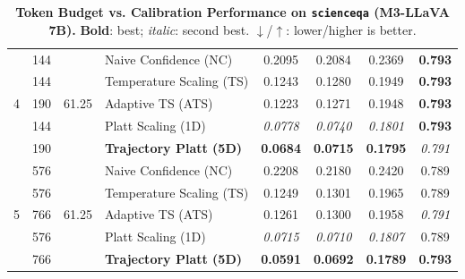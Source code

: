 \begin{table}[t]
\begin{tabular}{ccclcccc}
\midrule
\multirow{5}{*}{4} & 144 & \multirow{5}{*}{61.25} & Naive Confidence (NC) & 0.2095 & 0.2084 & 0.2369 & \textbf{0.793} \\
 & 144 &  & Temperature Scaling (TS) & 0.1243 & 0.1280 & 0.1949 & \textbf{0.793} \\
 & 190 &  & Adaptive TS (ATS) & 0.1223 & 0.1271 & 0.1948 & \textbf{0.793} \\
 & 144 &  & Platt Scaling (1D) & \textit{0.0778} & \textit{0.0740} & \textit{0.1801} & \textbf{0.793} \\
 & 190 &  & \textbf{Trajectory Platt (5D)} & \textbf{0.0684} & \textbf{0.0715} & \textbf{0.1795} & \textit{0.791} \\
\midrule
\multirow{5}{*}{5} & 576 & \multirow{5}{*}{61.25} & Naive Confidence (NC) & 0.2208 & 0.2180 & 0.2420 & 0.789 \\
 & 576 &  & Temperature Scaling (TS) & 0.1249 & 0.1301 & 0.1965 & 0.789 \\
 & 766 &  & Adaptive TS (ATS) & 0.1261 & 0.1300 & 0.1958 & \textit{0.791} \\
 & 576 &  & Platt Scaling (1D) & \textit{0.0715} & \textit{0.0710} & \textit{0.1807} & 0.789 \\
 & 766 &  & \textbf{Trajectory Platt (5D)} & \textbf{0.0591} & \textbf{0.0692} & \textbf{0.1789} & \textbf{0.793} \\
\bottomrule
\end{tabular}
\caption{\textbf{Token Budget vs. Calibration Performance on \texttt{scienceqa} (M3-LLaVA 7B).} \textbf{Bold}: best; \textit{italic}: second best. $\downarrow$/$\uparrow$: lower/higher is better.}
\label{tab:token_budget_scienceqa_m3}
\end{table}

